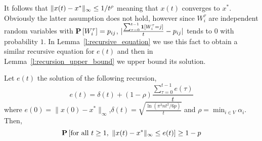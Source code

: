 It follows that $\| x(t)-x^* \|_{\infty} \leq 1/t^\rho$
meaning that $x(t)$ converges to $x^*$.
Obviously the latter assumption does not hold,
however since $W_i^{\tau}$ are independent random variables
with $\bm{\mathrm{P}}\left[W_i^\tau\right]=p_{ij}$,
$|\frac{\sum_{\tau=0}^{t-1} \bm{1}{\left[W_i^{\tau}=j\right]}}{t} - p_{ij}|$
tends to $0$ with probability $1$.
In Lemma~\ref{l:recursive_equation} we use this fact
to obtain a similar recursive equation for $e(t)$
and then in Lemma~\ref{l:recursion_upper_bound}
we upper bound its solution.
\begin{lemma}\label{l:recursive_equation}
Let $e(t)$ the solution of the following recursion,
\[e(t) =\delta(t) + (1-\rho)\frac{\sum_{\tau=0}^{t-1}e(\tau)}{t}\]
where $e(0)=\|x(0) - x^*\|_{\infty}$,\(\delta(t) = \sqrt{\frac{\ln(\pi^2n t^2/6p)}{t}}\)
and $\rho = \min_{i \in V}\alpha_i$. Then,
\[\bm{\mathrm{P}}\left[\text{for all }t \geq 1, ~\| x(t)-x^* \|_{\infty}\leq e(t)\right] \geq 1-p\]
\end{lemma}
